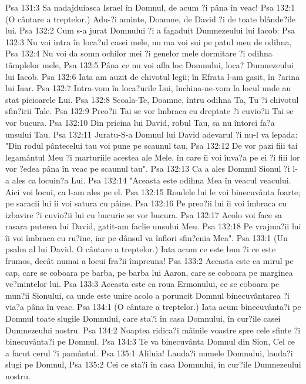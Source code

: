 Psa 131:3  Sa nadajduiasca Israel în Domnul, de acum ?i pâna în veac!
Psa 132:1  (O cântare a treptelor.) Adu-?i aminte, Doamne, de David ?i de toate blânde?ile lui.
Psa 132:2  Cum s-a jurat Domnului ?i a fagaduit Dumnezeului lui Iacob:
Psa 132:3  Nu voi intra în loca?ul casei mele, nu ma voi sui pe patul meu de odihna,
Psa 132:4  Nu voi da somn ochilor mei ?i genelor mele dormitare ?i odihna tâmplelor mele,
Psa 132:5  Pâna ce nu voi afla loc Domnului, loca? Dumnezeului lui Iacob.
Psa 132:6  Iata am auzit de chivotul legii; în Efrata l-am gasit, în ?arina lui Iaar.
Psa 132:7  Intra-vom în loca?urile Lui, închina-ne-vom la locul unde au stat picioarele Lui.
Psa 132:8  Scoala-Te, Doamne, întru odihna Ta, Tu ?i chivotul sfin?irii Tale.
Psa 132:9  Preo?ii Tai se vor îmbraca cu dreptate ?i cuvio?ii Tai se vor bucura.
Psa 132:10  Din pricina lui David, robul Tau, sa nu întorci fa?a unsului Tau.
Psa 132:11  Juratu-S-a Domnul lui David adevarul ?i nu-l va lepada: "Din rodul pântecelui tau voi pune pe scaunul tau,
Psa 132:12  De vor pazi fiii tai legamântul Meu ?i marturiile acestea ale Mele, în care îi voi înva?a pe ei ?i fiii lor vor ?edea pâna în veac pe scaunul tau".
Psa 132:13  Ca a ales Domnul Sionul ?i l-a ales ca locuin?a Lui.
Psa 132:14  "Aceasta este odihna Mea în veacul veacului. Aici voi locui, ca l-am ales pe el.
Psa 132:15  Roadele lui le voi binecuvânta foarte; pe saracii lui îi voi satura cu pâine.
Psa 132:16  Pe preo?ii lui îi voi îmbraca cu izbavire ?i cuvio?ii lui cu bucurie se vor bucura.
Psa 132:17  Acolo voi face sa rasara puterea lui David, gatit-am faclie unsului Meu.
Psa 132:18  Pe vrajma?ii lui îi voi îmbraca cu ru?ine, iar pe dânsul va înflori sfin?enia Mea".
Psa 133:1  (Un psalm al lui David. O cântare a treptelor.) Iata acum ce este bun ?i ce este frumos, decât numai a locui fra?ii împreuna!
Psa 133:2  Aceasta este ca mirul pe cap, care se coboara pe barba, pe barba lui Aaron, care se coboara pe marginea ve?mintelor lui.
Psa 133:3  Aceasta este ca roua Ermonului, ce se coboara pe mun?ii Sionului, ca unde este unire acolo a poruncit Domnul binecuvântarea ?i via?a pâna în veac.
Psa 134:1  (O cântare a treptelor.) Iata acum binecuvânta?i pe Domnul toate slugile Domnului, care sta?i în casa Domnului, în cur?ile casei Dumnezeului nostru.
Psa 134:2  Noaptea ridica?i mâinile voastre spre cele sfinte ?i binecuvânta?i pe Domnul.
Psa 134:3  Te va binecuvânta Domnul din Sion, Cel ce a facut cerul ?i pamântul.
Psa 135:1  Aliluia! Lauda?i numele Domnului, lauda?i slugi pe Domnul,
Psa 135:2  Cei ce sta?i în casa Domnului, în cur?ile Dumnezeului nostru.
